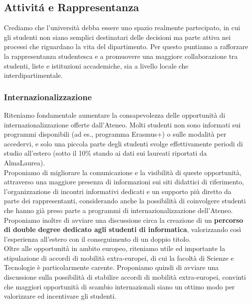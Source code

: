 \documentclass[12pt,a4paper]{article}
\begin{document}
\subsection{Attivitá e Rappresentanza}
Crediamo che l’università debba essere uno spazio realmente partecipato, in cui gli studenti non siano semplici destinatari delle decisioni ma parte attiva nei processi che riguardano la vita del dipartimento. Per questo puntiamo a rafforzare la rappresentanza studentesca e a promuovere una maggiore collaborazione tra studenti, liste e istituzioni accademiche, sia a livello locale che interdipartimentale.

\subsubsection{Internazionalizzazione}
Riteniamo fondamentale aumentare la consapevolezza delle opportunità di internazionalizzazione offerte dall'Ateneo. Molti studenti non sono informati sui programmi disponibili (ad es., programma Erasmus+) o sulle modalità per accedervi, e solo una piccola parte degli studenti svolge effettivamente periodi di studio all'estero (sotto il 10\% stando ai dati sui laureati riportati da AlmaLaurea).
\\ Proponiamo di migliorare la comunicazione e la visibilità di queste opportunità, attraverso una maggiore presenza di informazioni sui siti didattici di riferimento, l'organizzazione di incontri informativi dedicati e un supporto più diretto da parte dei rappresentanti, considerando anche la possibilità di coinvolgere studenti che hanno già preso parte a programmi di internazionalizzazione dell'Ateneo.
\\ Proponiamo inoltre di avviare una discussione circa la creazione di un \textbf{percorso di double degree dedicato agli studenti di informatica}, valorizzando così l'esperienza all'estero con il conseguimento di un doppio titolo.
\\ Oltre alle opportunità in ambito europeo, riteniamo utile ed importante la stipulazione di accordi di mobilità extra-europei, di cui la facoltà di Scienze e Tecnologie è particolarmente carente. Proponiamo quindi di avviare una discussione sulla possibilità di stabilire accordi di mobilità extra-europei, convinti che maggiori opportunità di scambio internazionali siano un ottimo modo per valorizzare ed incentivare gli studenti.
\end{document}
